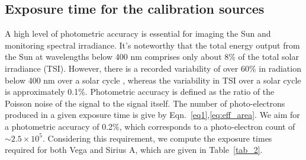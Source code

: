 \subsection{Exposure time for the calibration sources}\label{expo_time}

A high level of photometric accuracy is essential for imaging the Sun and monitoring spectral irradiance. It's noteworthy that the total energy output from the Sun at wavelengths below 400 nm comprises only about 8\% of the total solar irradiance (TSI). However, there is a recorded variability of over 60\% in radiation below 400 nm over a solar cycle \citep{krivova06}, whereas the variability in TSI over a solar cycle is approximately 0.1\%. Photometric accuracy is defined as the ratio of the Poisson noise of the signal to the signal itself. The number of photo-electrons produced in a given exposure time is give by Eqn.~\ref{eq1},\ref{eq:eff_area}. We aim for a photometric accuracy of 0.2\%, which corresponds to a photo-electron count of $\sim 2.5 \times 10^{5}$. Considering this requirement, we compute the exposure times required for both Vega and Sirius A, which are given in Table~\ref{tab_2}.

\begin{table}[ht!]
\centering
{}
    \caption{The exposure time required to obtain $2.5 \times 10^{5}$ photo-electrons to achieve 0.2\% photometric accuracy in each of the science filters for both Vega and Sirius A.}
\label{tab_2}
\end{table}

